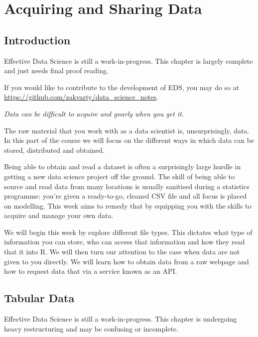 \documentclass[
  12pt,
]{book}
\begin{document}
\hypertarget{part-acquiring-and-sharing-data}{%
\part{Acquiring and Sharing Data}\label{part-acquiring-and-sharing-data}}

\hypertarget{data-introduction}{%
\chapter*{Introduction}\label{data-introduction}}

Effective Data Science is still a work-in-progress. This chapter is largely complete and just needs final proof reading.

If you would like to contribute to the development of EDS, you may do so at \url{https://github.com/zakvarty/data_science_notes}.

\emph{Data can be difficult to acquire and gnarly when you get it.}

The raw material that you work with as a data scientist is, unsurprisingly, data. In this part of the course we will focus on the different ways in which data can be stored, distributed and obtained.

Being able to obtain and read a dataset is often a surprisingly large hurdle in getting a new data science project off the ground. The skill of being able to source and read data from many locations is usually sanitised during a statistics programme: you're given a ready-to-go, cleaned CSV file and all focus is placed on modelling. This week aims to remedy that by equipping you with the skills to acquire and manage your own data.

We will begin this week by explore different file types. This dictates what type of information you can store, who can access that information and how they read that it into R. We will then turn our attention to the case when data are not given to you directly. We will learn how to obtain data from a raw webpage and how to request data that via a service known as an API.

\hypertarget{data-tabular}{%
\chapter{Tabular Data}\label{data-tabular}}

Effective Data Science is still a work-in-progress. This chapter is undergoing heavy restructuring and may be confusing or incomplete.
\end{document}
